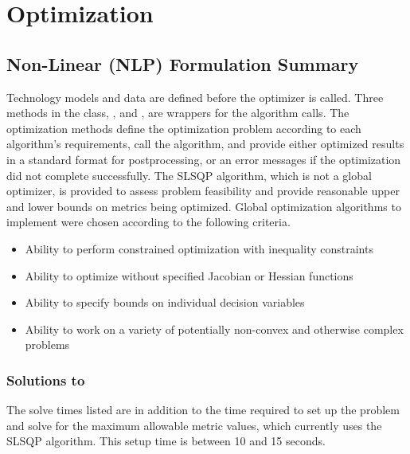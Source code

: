 \documentclass[letterpaper,10pt,english]{sphinxmanual}
\begin{document}
\begin{sphinxVerbatim}[commandchars=\\\{\}]
   \PYG{p}{[}  \PYG{p}{]}
\end{sphinxVerbatim}


\chapter{Optimization}
\label{\detokenize{optimizers:optimization}}\label{\detokenize{optimizers::doc}}

\section{Non-Linear (NLP) Formulation Summary}
\label{\detokenize{optimizers:non-linear-nlp-formulation-summary}}
Technology models and data are defined before the optimizer is called.
Three methods in the  class,
,  and , are
wrappers for the algorithm calls. The optimization methods define the
optimization problem according to each algorithm’s requirements, call
the algorithm, and provide either optimized results in a standard format
for postprocessing, or an error messages if the optimization did not
complete successfully. The SLSQP algorithm, which is not a global
optimizer, is provided to assess problem feasibility and provide
reasonable upper and lower bounds on metrics being optimized. Global
optimization algorithms to implement were chosen according to the
following criteria.
\begin{itemize}
\item {} 
Ability to perform constrained optimization with inequality
constraints

\item {} 
Ability to optimize without specified Jacobian or Hessian functions

\item {} 
Ability to specify bounds on individual decision variables

\item {} 
Ability to work on a variety of potentially non-convex and otherwise
complex problems

\end{itemize}


\subsection{Solutions to }
\label{\detokenize{optimizers:solutions-to-pv-residential-simple}}
The solve times listed are in addition to the time required to set up
the problem and solve for the maximum allowable metric values, which
currently uses the SLSQP algorithm. This setup time is between 10 and 15
seconds.
\end{document}

